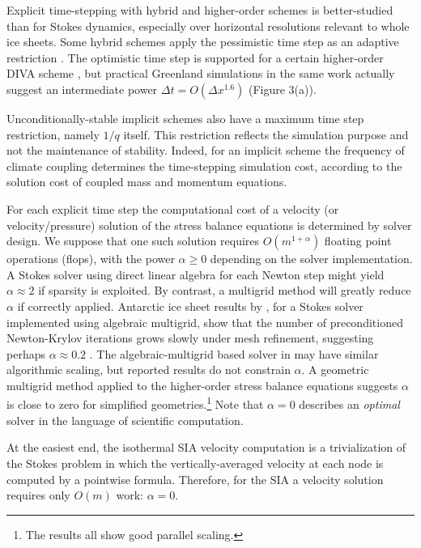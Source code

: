 \documentclass[twocolumn,letterpaper]{igs}
\begin{document}
Explicit time-stepping with hybrid and higher-order schemes is better-studied than for Stokes dynamics, especially over horizontal resolutions relevant to whole ice sheets.  Some hybrid schemes apply the pessimistic time step as an adaptive restriction \citep{Winkelmannetal2011}.  The optimistic time step is supported for a certain higher-order DIVA scheme \citep[see equation (52)]{Robinsonetal2022}, but practical Greenland simulations in the same work actually suggest an intermediate power $\Delta t = O(\Delta x^{1.6})$ (Figure 3(a)).

Unconditionally-stable implicit schemes also have a maximum time step restriction, namely $1/q$ itself.  This restriction reflects the simulation purpose and not the maintenance of stability.  Indeed, for an implicit scheme the frequency of climate coupling determines the time-stepping simulation cost, according to the solution cost of coupled mass and momentum equations.

For each explicit time step the computational cost of a velocity (or velocity/pressure) solution of the stress balance equations is determined by solver design.  We suppose that one such solution requires $O(m^{1+\alpha})$ floating point operations (flops),  with the power $\alpha\ge 0$ depending on the solver implementation.  A Stokes solver using direct linear algebra for each Newton step might yield $\alpha \approx 2$ if sparsity is exploited.  By contrast, a multigrid method \citep{Trottenbergetal2001} will greatly reduce $\alpha$ if correctly applied.  Antarctic ice sheet results by \cite{IsaacStadlerGhattas2015}, for a Stokes solver implemented using algebraic multigrid, show that the number of preconditioned Newton-Krylov iterations \citep{Bueler2021} grows slowly under mesh refinement, suggesting perhaps $\alpha\approx 0.2$ \citep[see Table 8.1]{IsaacStadlerGhattas2015}.
The algebraic-multigrid based solver in \cite{Lengetal2012} may have similar algorithmic scaling, but reported results do not constrain $\alpha$.  A geometric multigrid method applied to the higher-order stress balance equations \citep{BrownSmithAhmadia2013} suggests $\alpha$ is close to zero for simplified geometries.\footnote{The \cite{BrownSmithAhmadia2013,IsaacStadlerGhattas2015,Lengetal2012} results all show good parallel scaling.}  Note that $\alpha=0$ describes an \emph{optimal} solver  \citep{Bueler2021} in the language of scientific computation.

At the easiest end, the isothermal SIA velocity computation is a trivialization of the Stokes problem in which the vertically-averaged velocity at each node is computed by a pointwise formula.  Therefore, for the SIA a velocity solution requires only $O(m)$ work: $\alpha=0$.
\end{document}
